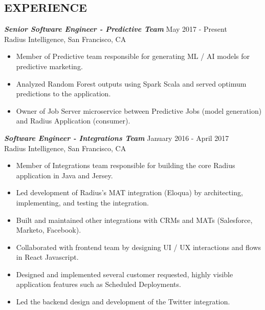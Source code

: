 \documentclass[overlapped, 10pt]{res} %
\begin{document}
\begin{resume}

 


 
\section{EXPERIENCE}\smallskip

{\sl \textbf{Senior Software Engineer - Predictive Team}} \hfill May 2017 - Present \\
Radius Intelligence, San Francisco, CA
\begin{itemize}
\item Member of Predictive team responsible for generating ML / AI models for predictive marketing.
\item Analyzed Random Forest outputs using Spark Scala and served optimum predictions to the application.
\item Owner of Job Server microservice between Predictive Jobs (model generation) and Radius Application (consumer).
\end{itemize} 

{\sl \textbf{Software Engineer - Integrations Team}} \hfill January 2016 - April 2017 \\
Radius Intelligence, San Francisco, CA
\begin{itemize} \itemsep -2pt %
\item Member of Integrations team responsible for building the core Radius application in Java and Jersey.
\item Led development of Radius’s MAT integration (Eloqua) by architecting, implementing, and testing the integration.
\item Built and maintained other integrations with CRMs and MATs (Salesforce, Marketo, Facebook).
\item Collaborated with frontend team by designing UI / UX interactions and flows in React Javascript.
\item Designed and implemented several customer requested, highly visible application features such as Scheduled Deployments.
\item Led the backend design and development of the Twitter integration.
\end{itemize}
 

\end{resume}
\end{document}
